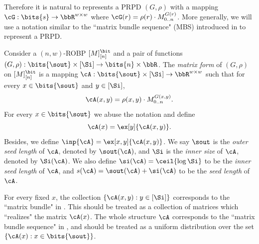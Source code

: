 Therefore it is natural to represents a PRPD $(G,\rho)$ with a mapping $\cG:\bits{s}\to \bbR^{w\times w}$ where $\cG(r)=\rho(r)\cdot M^{G(r)}_{0..n}$. More generally, we will use a notation similar to the ``matrix bundle sequence" (MBS) introduced in \cite{BCG18} to represent a PRPD.

\begin{definition}\label{def:MBS}
Consider a $(n,w)$-ROBP $[M]_{[n]}^{\bit}$ and a pair of functions $(G,\rho):\bits{\sout}\times[\Si]\to\bits{n}\times\bbR$. The \emph{matrix form} of $(G,\rho)$ on $[M]_{[n]}^{\bit}$ is a mapping $\cA:\bits{\sout}\times[\Si]\to\bbR^{w\times w}$ such that for every $x\in\bits{\sout}$ and $y\in[\Si]$,
$$\cA(x,y)=\rho(x,y)\cdot M_{0..n}^{G(x,y)}.$$
For every $x\in\bits{\sout}$ we abuse the notation and define
$$\cA(x)=\ex[y]{\cA(x,y)}.$$
Besides, we define $\inp{\cA}=\ex[x,y]{\cA(x,y)}$. We say $\sout$ is the \emph{outer seed length} of $\cA$, denoted by $\sout(\cA)$, and $\Si$ is the \emph{inner size} of $\cA$, denoted by $\Si(\cA)$. We also define $\si(\cA)=\ceil{\log \Si}$ to be the \emph{inner seed length} of $\cA$, and $s(\cA)=\sout(\cA)+\si(\cA)$ to be the \emph{seed length} of $\cA$.
\end{definition}
\begin{remark}
For every fixed $x$, the collection $\{\cA(x,y):y\in[\Si]\}$ corresponds to the ``matrix bundle" in \cite{BCG18}. This should be treated as a collection of matrices which ``realizes" the matrix $\cA(x)$. The whole structure $\cA$ corresponds to the ``matrix bundle sequence" in \cite{BCG18}, and should be treated as a uniform distribution over the set $\{\cA(x):x\in\bits{\sout}\}$. 
\end{remark}

